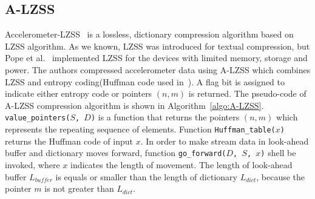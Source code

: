 
\subsection{A-LZSS}
Accelerometer-LZSS~\cite{pope2018accelerometer} is a lossless, dictionary
compression algorithm based on LZSS algorithm. As we known, LZSS was introduced
for textual compression, but Pope et al.~\cite{pope2018accelerometer}
implemented LZSS for the devices with limited memory, storage and power. The
authors compressed accelerometer data using A-LZSS which combines LZSS and
entropy coding(Huffman code used in~\cite{pope2018accelerometer}). A flag bit is
assigned to indicate either entropy code or pointers $(n, m)$ is returned. The
pseudo-code of A-LZSS compression algorithm is shown in Algorithm~\ref{algo:A-LZSS}.
\texttt{value\_pointers($S$, $D$)} is a function that returns the pointers $(n,
m)$ which represents the repeating sequence of elements. Function
\texttt{Huffman\_table($x$)} returns the Huffman code of input $x$. In order to
make stream data in look-ahead buffer and dictionary moves forward, function
\texttt{go\_forward($D$, $S$, $x$)} shell be invoked, where $x$ indicates the
length of movement. The length of look-ahead buffer $L_{buffer}$ is equals or
smaller than the length of dictionary $L_{dict}$, because the pointer $m$ is not
greater than $L_{dict}$. 

